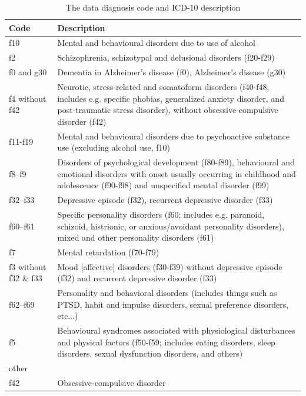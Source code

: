 \documentclass[
]{book}
\theoremstyle{definition}
\theoremstyle{definition}
\theoremstyle{definition}
\theoremstyle{definition}
\theoremstyle{remark}
\begin{document}
\begin{table}
\centering
\caption{\label{tab:icd10}The data diagnosis code and ICD-10 description}
\centering
\begin{tabular}[t]{l|l}
\hline
Code & Description\\
\hline
f10 & Mental and behavioural disorders due to use of alcohol\\
\hline
f2 & Schizophrenia, schizotypal and delusional disorders (f20-f29)\\
\hline
f0 and g30 & Dementia in Alzheimer’s disease (f0), Alzheimer’s disease (g30)\\
\hline
f4 without f42 & Neurotic, stress-related and somatoform disorders (f40-f48; includes e.g. specific phobias, generalized anxiety disorder, and post-traumatic stress disorder), without obsessive-compulsive disorder (f42)\\
\hline
f11-f19 & Mental and behavioural disorders due to psychoactive substance use (excluding alcohol use, f10)\\
\hline
f8–f9 & Disorders of psychological development (f80-f89), behavioural and emotional disorders with onset usually occurring in childhood and adolescence (f90-f98) and unspecified mental disorder (f99)\\
\hline
f32–f33 & Depressive episode (f32), recurrent depressive disorder (f33)\\
\hline
f60–f61 & Specific personality disorders (f60; includes e.g. paranoid, schizoid, histrionic, or anxious/avoidant personality disorders), mixed and other personality disorders (f61)\\
\hline
f7 & Mental retardation (f70-f79)\\
\hline
f3 without f32 \& f33 & Mood [affective] disorders (f30-f39) without depressive episode (f32) and recurrent depressive disorder (f33)\\
\hline
f62–f69 & Personality and behavioral disorders (includes things such as PTSD, habit and impulse disorders, sexual preference disorders, etc...)\\
\hline
f5 & Behavioural syndromes associated with physiological disturbances and physical factors (f50-f59; includes eating disorders, sleep disorders, sexual dysfunction disorders, and others)\\
\hline
other & \\
\hline
f42 & Obsessive-compulsive disorder\\
\hline
\end{tabular}
\end{table}
\end{document}
